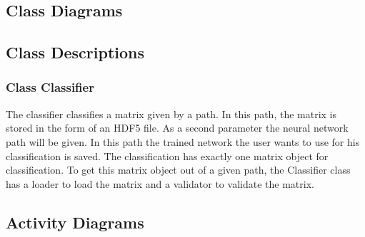 \documentclass[parskip=full]{scrartcl}
\begin{document}
\subsection{Class Diagrams}

\begin{figure}[h]
\begin{center}

\label{Class Diagram}
\end{center}
\end{figure}

\newpage


\subsection{Class Descriptions}

\subsubsection{Class Classifier}
The classifier classifies a matrix given by a path. 
In this path, the matrix is stored in the form of an HDF5 file.
As a second parameter the neural network path will be given. 
In this path the trained network the user wants to use for his classification is saved.
The classification has exactly one matrix object for classification. 
To get this matrix object out of a given path, the Classifier class has a loader to load the matrix and a validator to validate the matrix.

\newpage
 
\subsection{Activity Diagrams}
\end{document}
